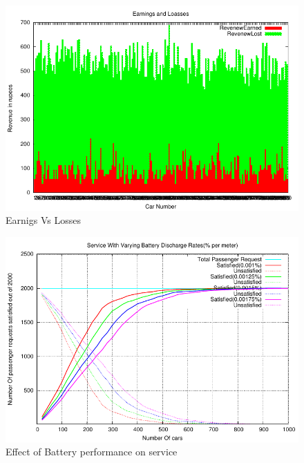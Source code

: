 \documentclass[11pt]{report}
\begin{document}
\begin{itemize}
\begin{figure}[h!t]
\centering
\includegraphics[scale=0.9]{../plots/EarnngsVsLosses}
\caption{Earnigs Vs Losses}\label{fig:SVM}
\end{figure}

\begin{figure}[h!t]
\centering
\includegraphics[scale=0.9]{../plots/nCarVariation_old}
\caption{Effect of Battery performance on service}\label{fig:SVM}
\end{figure}


\end{itemize}
\end{document}
